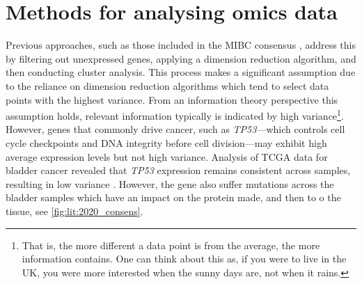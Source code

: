 
\section{Methods for analysing omics data} \label{s:lit:multi-omics}

\vspace{3mm}
\vspace{3mm}



Previous approaches, such as those included in the MIBC consensus \citep{Kamoun2020-tj}, address this by filtering out unexpressed genes, applying a dimension reduction algorithm, and then conducting cluster analysis. This process makes a significant assumption due to the reliance on dimension reduction algorithms which tend to select data points with the highest variance. From an information theory perspective this assumption holds, relevant information typically is indicated by high variance\footnote{That is, the more different a data point is from the average, the more information contains. One can think about this as, if you were to live in the UK, you were more interested when the sunny days are, not when it rains.}. However, genes that commonly drive cancer, such as \textit{TP53}—which controls cell cycle checkpoints and DNA integrity before cell division—may exhibit high average expression levels but not high variance. Analysis of TCGA data for bladder cancer revealed that \textit{TP53} expression remains consistent across samples, resulting in low variance \citep{Robertson2017-mg}. However, the gene also suffer mutations across the bladder samples which have an impact on the protein made, and then to o the tissue, see \cref{fig:lit:2020_consens}.

